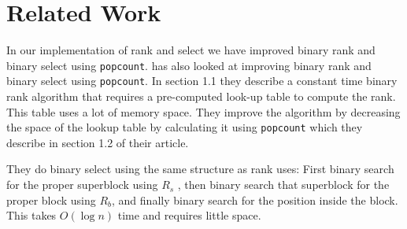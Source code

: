 \section{Related Work}
In our implementation of rank and select we have improved binary rank and binary select using \texttt{popcount}.
\cite{Gonzalez05practicalimplementation} has also looked at improving binary rank and binary select using \texttt{popcount}. 
In section 1.1 they describe a constant time binary rank algorithm that requires a pre-computed look-up table to compute the rank. 
This table uses a lot of memory space. 
They improve the algorithm by decreasing the space of the lookup table by calculating it using \texttt{popcount} which they describe in section 1.2 of their article. 

They do binary select using the same structure as rank uses: First binary search for the proper superblock using $R_s$ , then binary search that superblock for the proper block using $R_b$, and finally binary search for the position inside the block. 
This takes $O(\log n)$ time and requires little space.

